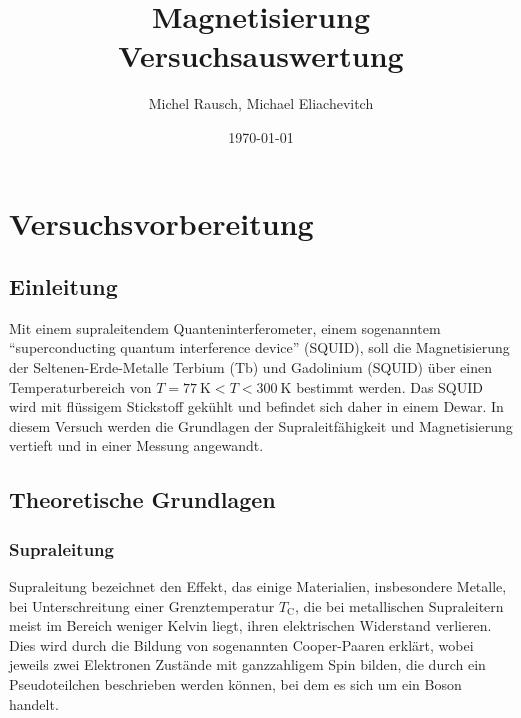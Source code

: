 \documentclass[a4paper,ngerman]{scrartcl}
\title{Magnetisierung\\Versuchsauswertung}
\date{\today}
\author{Michel Rausch, Michael Eliachevitch}
\begin{document}
\maketitle
\tableofcontents
\newpage

\section{Versuchsvorbereitung}

\subsection{Einleitung}


Mit einem supraleitendem Quanteninterferometer, einem sogenanntem
"`superconducting quantum interference device"' (SQUID), soll
die Magnetisierung der Seltenen-Erde-Metalle Terbium (Tb) und
Gadolinium (SQUID) über einen Temperaturbereich von $T=
\SI{77}{\kelvin} < T < \SI{300}{\kelvin}$ bestimmt werden.
Das SQUID wird mit flüssigem Stickstoff gekühlt und befindet sich
daher in einem Dewar. In diesem Versuch werden die Grundlagen der
Supraleitfähigkeit und Magnetisierung vertieft und in einer Messung
angewandt.


\subsection{Theoretische Grundlagen}

\subsubsection{Supraleitung}

Supraleitung bezeichnet den Effekt, das einige Materialien,
insbesondere Metalle, bei Unterschreitung einer Grenztemperatur
$T_{\mathrm{C}}$, die bei metallischen Supraleitern meist im Bereich
weniger Kelvin liegt, ihren elektrischen Widerstand verlieren.
Dies wird durch die Bildung von sogenannten Cooper-Paaren erklärt,
wobei jeweils zwei Elektronen Zustände mit ganzzahligem
Spin bilden, die durch ein Pseudoteilchen beschrieben werden können,
bei dem es sich um ein Boson handelt.
\end{document}
